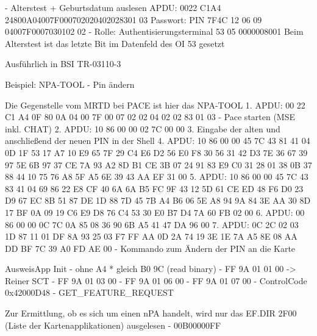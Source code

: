 \documentclass[toc=flat,fontsize=11pt,a4paper,titlepage,headsepline,numbers=noenddot, bibliography=totoc]{scrartcl}
\begin{document}
- Alterstest + Geburtsdatum auslesen
APDU: 0022
		C1A4
			24800A04007F000702020402028301 03 Passwort: PIN
		7F4C
			12
			06 09 04007F0007030102 02 - Rolle: Authentisierungsterminal
			53 05 0000008001
Beim Alterstest ist das letzte Bit im Datenfeld des OI 53 gesetzt


Ausführlich in BSI TR-03110-3

Beispiel: NPA-TOOL - Pin ändern

Die Gegenstelle vom MRTD bei PACE ist hier das NPA-TOOL 
1. APDU: 00 22 C1 A4 0F 80 0A 04 00 7F 00 07 02 02 04 02 02 83 01 03 - Pace starten (MSE inkl. CHAT)
2. APDU: 10 86 00 00 02 7C 00 00
3. Eingabe der alten und anschließend der neuen PIN in der Shell
4. APDU: 10 86 00 00 45 7C 43 81 41 04 0D 1F 53 17 A7 10 E9 65 7F 29 C4 E6 D2 56 E0 F8 30 56 31 42 D3 7E 36 67 39 97 5E 6B 97 37 CE 7A 93 A2 8D B1 CE 3B 07 24 91 83 E9 C0 31 28 01 38 0B 37 88 44 10 75 76 A8 5F A5 6E 39 43 AA EF 31 00
5. APDU: 10 86 00 00 45 7C 43 83 41 04 69 86 22 E8 CF 40 6A 6A B5 FC 9F 43 12 5D 61 CE ED 48 F6 D0 23 D9 67 EC 8B 51 87 DE 1D 88 7D 45 7B A4 B6 06 5E A8 94 9A 84 3E AA 30 8D 17 BF 0A 09 19 C6 E9 D8 76 C4 53 30 E0 B7 D4 7A 60 FB 02 00
6. APDU: 00 86 00 00 0C 7C 0A 85 08 36 90 6B A5 41 47 DA 96 00
7. APDU: 0C 2C 02 03 1D 87 11 01 DF 8A 93 25 03 F7 FF AA 0D 2A 74 19 3E 1E 7A A5 8E 08 AA DD BF 7C 39 A0 FD AE 00 - Kommando zum Ändern der PIN an die Karte

AusweisApp
Init 
- ohne A4 * gleich B0 9C (read binary)
- FF 9A 01 01 00 -> Reiner SCT
- FF 9A 01 03 00
- FF 9A 01 06 00
- FF 9A 01 07 00
- ControlCode 0x42000D48 - GET_FEATURE_REQUEST

Zur Ermittlung, ob es sich um einen nPA handelt, wird nur das EF.DIR 2F00 (Liste der Kartenapplikationen) ausgelesen - 00B00000FF
\end{document}
